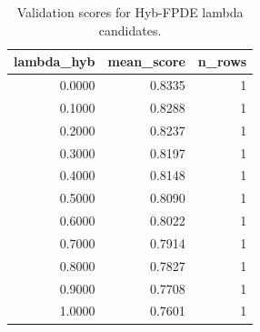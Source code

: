 \begin{table}[t]
\caption{Validation scores for Hyb-FPDE lambda candidates.}
\label{tab:lambda_distribution_computed}
\centering
\begin{tabular}{rrr}
\toprule
lambda\_hyb & mean\_score & n\_rows \\
\midrule
0.0000 & 0.8335 & 1 \\
0.1000 & 0.8288 & 1 \\
0.2000 & 0.8237 & 1 \\
0.3000 & 0.8197 & 1 \\
0.4000 & 0.8148 & 1 \\
0.5000 & 0.8090 & 1 \\
0.6000 & 0.8022 & 1 \\
0.7000 & 0.7914 & 1 \\
0.8000 & 0.7827 & 1 \\
0.9000 & 0.7708 & 1 \\
1.0000 & 0.7601 & 1 \\
\bottomrule
\end{tabular}

\end{table}
